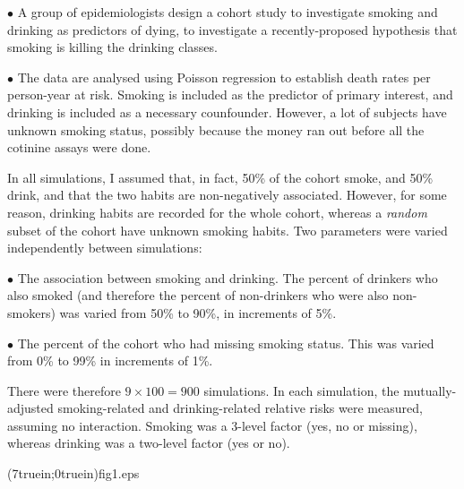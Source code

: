 \item{$\bullet$} A group of epidemiologists design a cohort study to investigate
smoking and drinking as predictors of dying, to investigate
a recently-proposed hypothesis that smoking is killing the drinking classes.

\item{$\bullet$} The data are analysed using Poisson regression to establish death rates per
person-year at risk. Smoking is included as the predictor of primary interest, and drinking
is included as a necessary counfounder. However, a lot of subjects have unknown smoking status,
possibly because the money ran out before all the cotinine assays were done.

\enditems

\vfill\eject
\medskip


In all simulations, I assumed that, in fact, 50\% of the cohort smoke, and 50\% drink, and that the
two habits are non-negatively associated. However, for some reason, drinking habits are recorded
for the whole cohort, whereas a {\it random} subset of the cohort have unknown smoking habits.
Two parameters were varied independently between simulations:

\beginitems

\item{$\bullet$} The association between smoking and drinking. The percent of drinkers who also smoked
(and therefore the percent of non-drinkers who were also non-smokers) was varied from 50\%
to 90\%, in increments of 5\%.

\item{$\bullet$} The percent of the cohort who had missing smoking status. This was varied from
0\% to 99\% in increments of 1\%.

There were therefore $9\times 100 = 900$ simulations. In each simulation, the mutually-adjusted
smoking-related and drinking-related relative risks were measured, assuming no interaction. \break
Smoking was a 3-level factor (yes, no or missing), whereas drinking was a two-level factor
(yes or no).

\enditems


\vfill\eject
\medskip
{}

\medskip

\psboxto(7truein;0truein){fig1.eps}

\medskip

